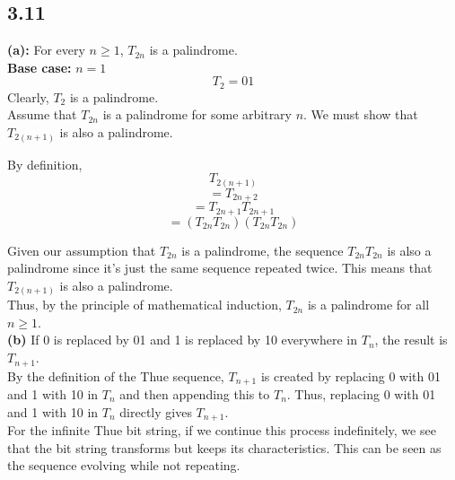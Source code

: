 \documentclass{article}
\begin{document}
\subsection*{3.11}
\textbf{(a):} For every \( n \geq 1 \), \( T_{2n} \) is a palindrome.
\\[1\baselineskip]
\textbf{Base case:} \( n = 1 \)
\[ T_2 = 01 \]
Clearly, \( T_2 \) is a palindrome.
\\[1\baselineskip]
Assume that \( T_{2n} \) is a palindrome for some arbitrary \( n \). We must show that \( T_{2(n+1)} \) is also a palindrome.

By definition, 
\[ T_{2(n+1)} \]
\[ = T_{2n+2} \]
\[ = T_{2n+1} T_{2n+1} \]
\[ = (T_{2n} T_{2n}) (T_{2n} T_{2n}) \]

Given our assumption that \( T_{2n} \) is a palindrome, the sequence \( T_{2n}T_{2n} \) is also a palindrome since it's just the same sequence repeated twice. This means that \( T_{2(n+1)} \) is also a palindrome.
\\[1\baselineskip]
Thus, by the principle of mathematical induction, \( T_{2n} \) is a palindrome for all \( n \geq 1 \).
\\[1\baselineskip]
\textbf{(b)} If 0 is replaced by 01 and 1 is replaced by 10 everywhere in \( T_n \), the result is \( T_{n+1} \).
\\[1\baselineskip]
By the definition of the Thue sequence, \( T_{n+1} \) is created by replacing 0 with 01 and 1 with 10 in \( T_n \) and then appending this to \( T_n \). Thus, replacing 0 with 01 and 1 with 10 in \( T_n \) directly gives \( T_{n+1} \).
\\[1\baselineskip]
For the infinite Thue bit string, if we continue this process indefinitely, we see that the bit string transforms but keeps its characteristics. This can be seen as the sequence evolving while not repeating.
\end{document}
